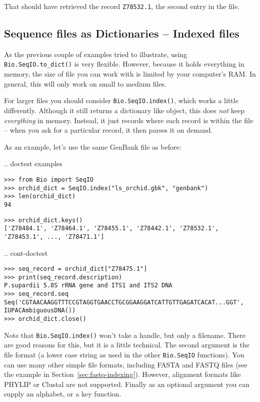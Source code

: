 \noindent That should have retrieved the record \texttt{Z78532.1}, the second entry in the file.

\subsection{Sequence files as Dictionaries -- Indexed files}
\label{sec:SeqIO-index}

As the previous couple of examples tried to illustrate, using
\verb|Bio.SeqIO.to_dict()| is very flexible. However, because it holds
everything in memory, the size of file you can work with is limited by your
computer's RAM. In general, this will only work on small to medium files.

For larger files you should consider
\verb|Bio.SeqIO.index()|, which works a little differently. Although
it still returns a dictionary like object, this does \emph{not} keep
\emph{everything} in memory. Instead, it just records where each record
is within the file -- when you ask for a particular record, it then parses
it on demand.

As an example, let's use the same GenBank file as before:

\pandocignoreme .. doctest examples
\begin{verbatim}
>>> from Bio import SeqIO
>>> orchid_dict = SeqIO.index("ls_orchid.gbk", "genbank")
>>> len(orchid_dict)
94
\end{verbatim}
\begin{verbatim}
>>> orchid_dict.keys()
['Z78484.1', 'Z78464.1', 'Z78455.1', 'Z78442.1', 'Z78532.1', 'Z78453.1', ..., 'Z78471.1']
\end{verbatim}

\pandocignoreme .. cont-doctest
\begin{verbatim}
>>> seq_record = orchid_dict["Z78475.1"]
>>> print(seq_record.description)
P.supardii 5.8S rRNA gene and ITS1 and ITS2 DNA
>>> seq_record.seq
Seq('CGTAACAAGGTTTCCGTAGGTGAACCTGCGGAAGGATCATTGTTGAGATCACAT...GGT', IUPACAmbiguousDNA())
>>> orchid_dict.close()
\end{verbatim}

\noindent Note that \verb|Bio.SeqIO.index()| won't take a handle,
but only a filename. There are good reasons for this, but it is a little
technical. The second argument is the file format (a lower case string as
used in the other \verb|Bio.SeqIO| functions). You can use many other
simple file formats, including FASTA and FASTQ files (see the example in
Section~\ref{sec:fastq-indexing}). However, alignment
formats like PHYLIP or Clustal are not supported. Finally as an optional
argument you can supply an alphabet, or a key function.


